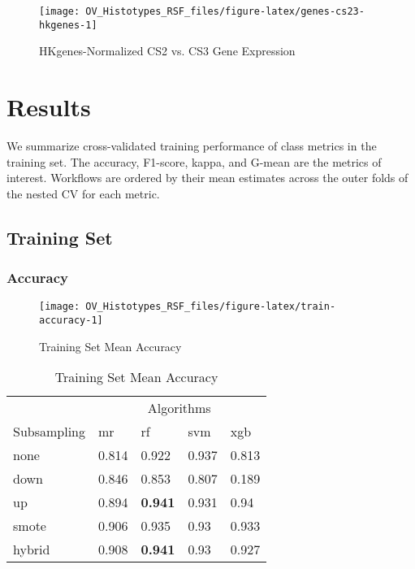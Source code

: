 \documentclass[
]{report}
\begin{document}
\begin{figure}[H]

{\centering \texttt{[image: OV\_Histotypes\_RSF\_files/figure-latex/genes-cs23-hkgenes-1]} 

}

\caption{HKgenes-Normalized CS2 vs. CS3 Gene Expression}\label{fig:genes-cs23-hkgenes}
\end{figure}

\hypertarget{results}{%
\chapter{Results}\label{results}}

We summarize cross-validated training performance of class metrics in the training set. The accuracy, F1-score, kappa, and G-mean are the metrics of interest. Workflows are ordered by their mean estimates across the outer folds of the nested CV for each metric.

\hypertarget{training-set}{%
\section{Training Set}\label{training-set}}

\hypertarget{accuracy}{%
\subsection{Accuracy}\label{accuracy}}

\begin{figure}[H]

{\centering \texttt{[image: OV\_Histotypes\_RSF\_files/figure-latex/train-accuracy-1]} 

}

\caption{Training Set Mean Accuracy}\label{fig:train-accuracy}
\end{figure}

\begin{table}

\caption{\label{tab:train-accuracy-table}Training Set Mean Accuracy}
\centering
\begin{tabular}[t]{l|l|l|l|l}
\hline
\multicolumn{1}{c|}{ } & \multicolumn{4}{c}{Algorithms} \\
\cline{2-5}
Subsampling & mr & rf & svm & xgb\\
\hline
none & 0.814 & 0.922 & 0.937 & 0.813\\
\hline
down & 0.846 & 0.853 & 0.807 & 0.189\\
\hline
up & 0.894 & \textbf{0.941} & 0.931 & 0.94\\
\hline
smote & 0.906 & 0.935 & 0.93 & 0.933\\
\hline
hybrid & 0.908 & \textbf{0.941} & 0.93 & 0.927\\
\hline
\end{tabular}
\end{table}
\end{document}
